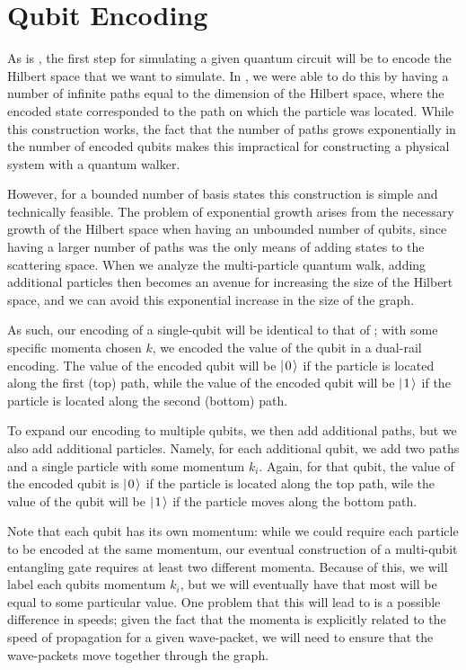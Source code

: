 \documentclass[../thesis-main/thesis-main]{subfiles}
\begin{document}
%

\section{Qubit Encoding}\label{sec:MP_qubit_encoding}

As is , the first step for simulating a given quantum circuit will be to encode the Hilbert space that we want to simulate.  In , we were able to do this by having a number of infinite paths equal to the dimension of the Hilbert space,  where the encoded state corresponded to the path on which the particle was located.  While this construction works, the fact that the number of paths grows exponentially in the number of encoded qubits makes this impractical for constructing a physical system with a quantum walker.

However, for a bounded number of basis states this construction is simple and technically feasible.  The problem of exponential growth arises from the necessary growth of the Hilbert space when having an unbounded number of qubits, since having a larger number of paths was the only means of adding states to the scattering space.  When we analyze the multi-particle quantum walk, adding additional particles then becomes an avenue for increasing the size of the Hilbert space, and we can avoid this exponential increase in the size of the graph.

As such, our encoding of a single-qubit will be identical to that of ; with some specific momenta chosen $k$, we encoded the value of the qubit in a dual-rail encoding.  The value of the encoded qubit will be $|\mspace{2mu} 0 \mspace{2mu} \rangle$ if the particle is located along the first (top) path, while the value of the encoded qubit will be $|\mspace{2mu} 1 \mspace{2mu} \rangle$ if the particle is located along the second (bottom) path.

To expand our encoding to multiple qubits, we then add additional paths, but we also add additional particles.  Namely, for each additional qubit, we add two paths and a single particle with some momentum $k_i$.  Again, for that qubit, the value of the encoded qubit is $|\mspace{2mu} 0 \mspace{2mu} \rangle$ if the particle is located along the top path, wile the value of the qubit will be $|\mspace{2mu} 1 \mspace{2mu} \rangle$ if the particle moves along the bottom path.

Note that each qubit has its own momentum: while we could require each particle to be encoded at the same momentum, our eventual construction of a multi-qubit entangling gate requires at least two different momenta.  Because of this, we will label each qubits momentum $k_i$, but we will eventually have that most will be equal to some particular value.  One problem that this will lead to is a possible difference in speeds; given the fact that the momenta is explicitly related to the speed of propagation for a given wave-packet, we will need to ensure that the wave-packets move together through the graph.
\end{document}
